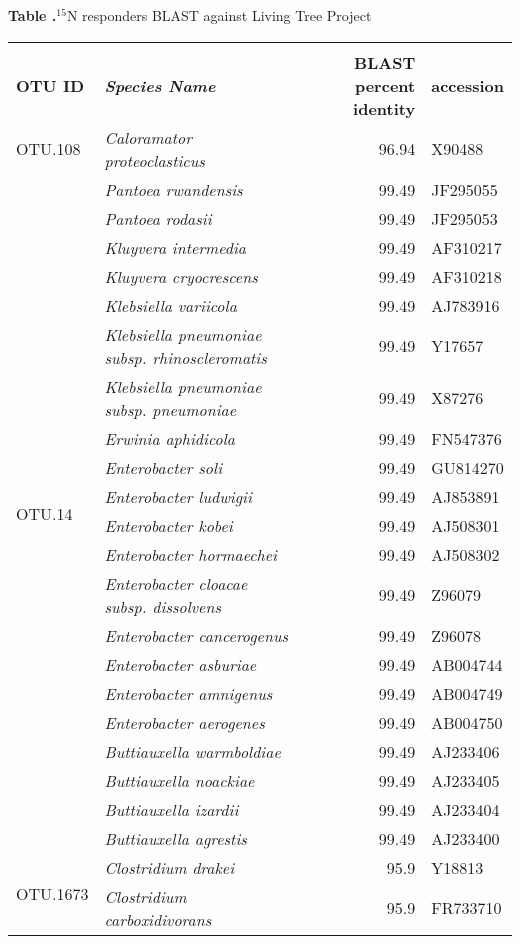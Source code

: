 \begin{table}[H]

\textbf{\label{tab:LTP_blast} Table
.}{$^{15}$N responders BLAST against Living Tree Project}

{\small\begin{tabular}{l>{\itshape}lrl}
    \toprule \\
    \textbf{OTU ID} & \textbf{Species Name} & \textbf{BLAST percent identity} & \textbf{accession} \\
    \midrule
    \multirow{1}{*}{OTU.108} & Caloramator proteoclasticus & 96.94 & X90488 \\ \midrule
\multirow{21}{*}{OTU.14} & Pantoea rwandensis & 99.49 & JF295055 \\  & Pantoea rodasii & 99.49 & JF295053 \\  & Kluyvera intermedia & 99.49 & AF310217 \\  & Kluyvera cryocrescens & 99.49 & AF310218 \\  & Klebsiella variicola & 99.49 & AJ783916 \\  & Klebsiella pneumoniae subsp. rhinoscleromatis & 99.49 & Y17657 \\  & Klebsiella pneumoniae subsp. pneumoniae & 99.49 & X87276 \\  & Erwinia aphidicola & 99.49 & FN547376 \\  & Enterobacter soli & 99.49 & GU814270 \\  & Enterobacter ludwigii & 99.49 & AJ853891 \\  & Enterobacter kobei & 99.49 & AJ508301 \\  & Enterobacter hormaechei & 99.49 & AJ508302 \\  & Enterobacter cloacae subsp. dissolvens & 99.49 & Z96079 \\  & Enterobacter cancerogenus & 99.49 & Z96078 \\  & Enterobacter asburiae & 99.49 & AB004744 \\  & Enterobacter amnigenus & 99.49 & AB004749 \\  & Enterobacter aerogenes & 99.49 & AB004750 \\  & Buttiauxella warmboldiae & 99.49 & AJ233406 \\  & Buttiauxella noackiae & 99.49 & AJ233405 \\  & Buttiauxella izardii & 99.49 & AJ233404 \\  & Buttiauxella agrestis & 99.49 & AJ233400 \\ \midrule
\multirow{2}{*}{OTU.1673} & Clostridium drakei & 95.9 & Y18813 \\  & Clostridium carboxidivorans & 95.9 & FR733710 \\ \midrule

\end{tabular}}
\end{table}
